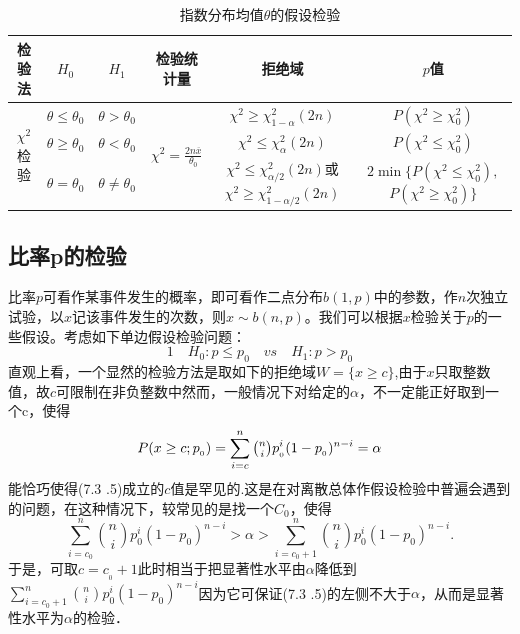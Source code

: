 \begin{table}[H]
    \caption{指数分布均值$\theta$的假设检验}
    \centering
    \begin{tabular}{cccccc}
        \toprule[1.5pt]
        检验法                         & $H_0$                        & $H_1$                        & 检验统计量                                                   & 拒绝域                                              & $p$值                      \\
        \midrule[1pt]
        \multirow{3}{*}{$\chi^2$检验} & $\theta \leq \theta_0$   & $\theta > \theta_0$      & \multirow{3}{*}{$\chi^2=\frac{2n \overline{x}}{\theta_0}$} & $\chi^2 \geq \chi_{1-\alpha}^2(2n)$             & $P(\chi^2 \geq \chi_0^2)$ \\

        & $\theta \geq \theta_0$   & $\theta< \theta_0$      &                                                         & $\chi^2 \leq \chi_{\alpha}^2(2n)$               & $P(\chi^2 \leq \chi^2_0)$ \\

        & $\theta= \theta_0$      & $\theta \neq \theta_0$   &                                                         & \makecell{$\chi^2 \leq \chi_{\alpha /2}^2(2n)$或 \\
        $\chi^2 \geq \chi_{1-\alpha /2}^2(2n) $} &\makecell{$2\min\{P(\chi^{2}\leq \chi_{0}^{2}),$\\$P(\chi^{2}\geq \chi_{0}^{2})\}$}\\
        \bottomrule
    \end{tabular}
\end{table}
\subsection{比率p的检验}
比率$p$可看作某事件发生的概率，即可看作二点分布$b(1,p)$中的参数，作$n$次独立试验，以$x$记该事件发生的次数，则$x \sim b(n,p)$。我们可以根据$x$检验关于$p$的一些假设。考虑如下单边假设检验问题：
\begin{equation}
    1 \quad H_0:p \leq p_0 \quad vs \quad H_1:p > p_0
\end{equation}
直观上看，一个显然的检验方法是取如下的拒绝域$W=\{x\geq c\}$,由于$x$只取整数值，故$c$可限制在非负整数中然而，一般情况下对给定的$\alpha$，不一定能正好取到一个c，使得
\begin{equation}
    P(x \geq c;p_{_0}) = \sum_{i=c}^{n}\tbinom{n}{i}p_{_0}^i(1-p_{_0})^{n-i} = \alpha
\end{equation}
能恰巧使得(7.3 .5)成立的$c$值是罕见的.这是在对离散总体作假设检验中普遍会遇到的问题，在这种情况下，较常见的是找一个$C_0$，使得
$$\sum_{i=c_0}^n\binom{n}{i}p_0^i(1-p_0)^{n-i}>\alpha>\sum_{i=c_0+1}^n\binom{n}{i}p_0^i(1-p_0)^{n-i}.$$
于是，可取$c=c_{_0}+1$此时相当于把显著性水平由$\alpha$降低到$\sum_{i=c_0+1}^n{\binom ni}p_0^i(1-p_0)^{n-i}$因为它可保证(7.3 .5)的左侧不大于$\alpha$，从而是显著性水平为$\alpha$的检验．

